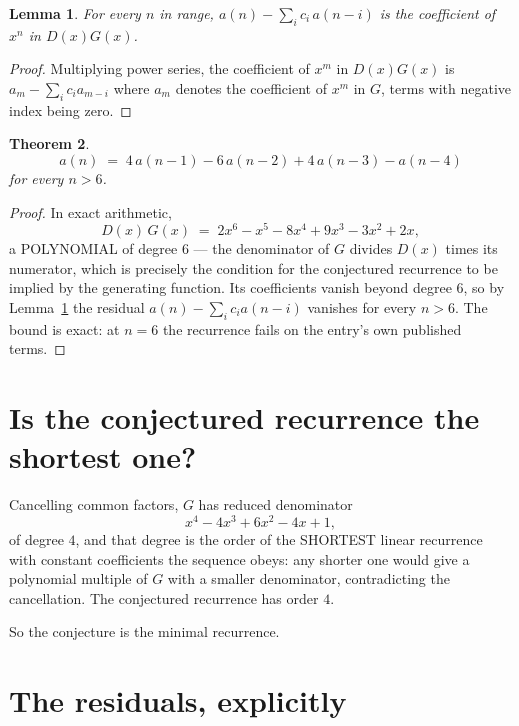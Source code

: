 \documentclass[11pt,a4paper]{article}
\theoremstyle{plain}
\newtheorem{theorem}{Theorem}
\newtheorem{lemma}[theorem]{Lemma}
\theoremstyle{definition}
\begin{document}
\begin{lemma}\label{lem:key}
For every $n$ in range, $a(n)-\sum_i c_i\,a(n-i)$ is the coefficient of $x^{n}$ in
$D(x)G(x)$.
\end{lemma}

\begin{proof}
Multiplying power series, the coefficient of $x^{m}$ in $D(x)G(x)$ is
$a_m-\sum_i c_i a_{m-i}$ where $a_m$ denotes the coefficient of $x^{m}$ in $G$, terms with
negative index being zero.
\end{proof}

\begin{theorem}
\[
a(n)\;=\;4\,a(n-1) - 6\,a(n-2) + 4\,a(n-3) - a(n-4)
\]
for every $n>6$.
\end{theorem}

\begin{proof}
In exact arithmetic,
\[
D(x)\,G(x)\;=\;2 x^{6} - x^{5} - 8 x^{4} + 9 x^{3} - 3 x^{2} + 2 x,
\]
a POLYNOMIAL of degree $6$ --- the denominator of $G$ divides $D(x)$ times its numerator,
which is precisely the condition for the conjectured recurrence to be implied by the
generating function. Its coefficients vanish beyond degree $6$, so by
Lemma~\ref{lem:key} the residual $a(n)-\sum_ic_ia(n-i)$ vanishes for every
$n>6$. The bound is exact: at $n=6$ the recurrence fails on the entry's own published terms.
\end{proof}

\section{Is the conjectured recurrence the shortest one?}

Cancelling common factors, $G$ has reduced denominator
\[
x^{4} - 4 x^{3} + 6 x^{2} - 4 x + 1,
\]
of degree $4$, and that degree is the order of the SHORTEST linear recurrence with
constant coefficients the sequence obeys: any shorter one would give a polynomial multiple of
$G$ with a smaller denominator, contradicting the cancellation. The conjectured recurrence has
order $4$.

So the conjecture is the minimal recurrence.

\section{The residuals, explicitly}
\end{document}
